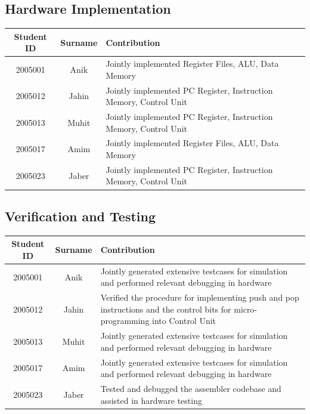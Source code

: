 \documentclass{article}
\begin{document}
		\subsection{Hardware Implementation}
		
		
		
		\begin{table}[h]
			\centering
			\begin{tabular}{|c|c|m{10cm}|}
				\hline
				Student ID & Surname & Contribution \\ 
				\hline
				2005001    & Anik    & Jointly implemented Register Files, ALU, Data Memory    \\ 
				\hline
				2005012    & Jahin   & Jointly implemented PC Register, Instruction Memory, Control Unit  \\ 
				\hline
				2005013    & Muhit   & Jointly implemented PC Register, Instruction Memory, Control Unit     \\ 
				\hline
				2005017    & Amim    &  Jointly implemented Register Files, ALU, Data Memory    \\ \hline
				2005023    & Jaber   &  Jointly implemented PC Register, Instruction Memory, Control Unit     \\ 
				\hline
			\end{tabular}
		\end{table}
		
		
		\subsection{Verification and Testing}
		
		
		\begin{table}[h]
			\centering
			\begin{tabular}{|c|c|m{10cm}|}
				\hline
				Student ID & Surname & Contribution \\ 
				\hline
				2005001    & Anik    &  Jointly generated extensive testcases for simulation and performed relevant debugging in hardware \\ 
				\hline
				2005012    & Jahin   &  Verified the procedure for implementing push and pop instructions and the control bits for micro-programming into Control Unit \\ 
				\hline
				2005013    & Muhit   &  Jointly generated extensive testcases for simulation and performed relevant debugging in hardware \\ 
				\hline
				2005017    & Amim    & Jointly generated extensive testcases for simulation and performed relevant debugging in hardware \\ 
				\hline
				2005023    & Jaber   & Tested and debugged the assembler codebase and assisted in hardware testing \\ 
				\hline
			\end{tabular}
		\end{table}
		
		
	
\end{document}

